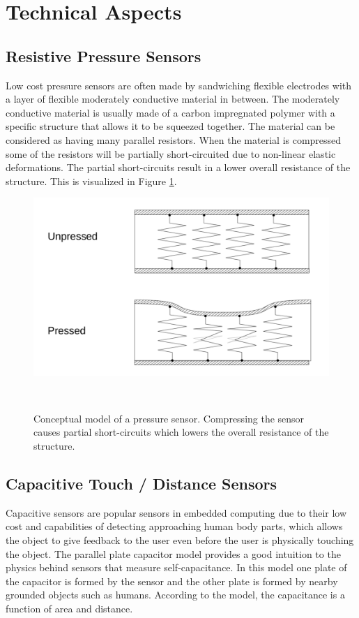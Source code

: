 \documentclass{sigchi-ext}
\begin{document}
\section{Technical Aspects}
\subsection{Resistive Pressure Sensors}
Low cost pressure sensors are often made by sandwiching flexible electrodes
with a layer of flexible moderately conductive material in between. The
moderately conductive material is usually made of a carbon impregnated polymer
with a specific structure that allows it to be squeezed together. The material
can be considered as having many parallel resistors. When the material is
compressed some of the resistors will be partially short-circuited due to
non-linear elastic deformations. The partial short-circuits result in a lower
overall resistance of the structure. This is visualized
in Figure \ref{fig:pressure_sensor}.

\begin{figure}[h!]
\centering
\includegraphics[width=0.9\columnwidth]{figures/resistive_sensor}
 \caption{Conceptual model of a pressure sensor. Compressing the sensor causes
  partial short-circuits which lowers the overall resistance of the
  structure.}~\label{fig:pressure_sensor}
\end{figure}



\subsection{Capacitive Touch / Distance Sensors}
Capacitive sensors are popular sensors in embedded computing due to their low cost
and capabilities of detecting approaching human body parts, which allows the
object to give feedback to the user even before the user is physically touching
the object. The parallel plate capacitor model provides a good intuition to the
physics behind sensors that measure self-capacitance. In this model one plate of
the capacitor is formed by the sensor and the other plate is formed by
nearby grounded objects such as humans. According to the model, the capacitance is a function of area
and distance.
\end{document}
